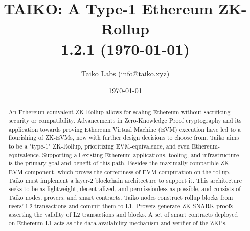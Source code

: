 \documentclass[9pt,oneside]{amsart}
\date{\today}
\title[TAIKO: A Type-1 Ethereum ZK-Rollup\\ \smaller
\textbf{{1.2.1}}]{TAIKO: A Type-1 Ethereum ZK-Rollup \\ \smaller \textbf{{1.2.1 (\today)}}}
\author{Taiko Labs (info@taiko.xyz)}
\begin{document}
\pagecolor{pagecolor}

\begin{abstract}
An Ethereum-equivalent ZK-Rollup allows for scaling Ethereum without sacrificing security or compatibility. Advancements in Zero-Knowledge Proof cryptography and its application towards proving Ethereum Virtual Machine (EVM) execution have led to a flourishing of ZK-EVMs, now with further design decisions to choose from. Taiko aims to be a "type-1" ZK-Rollup, prioritizing EVM-equivalence, and even Ethereum-equivalence. Supporting all existing Ethereum applications, tooling, and infrastructure is the primary goal and benefit of this path. Besides the maximally compatible ZK-EVM component, which proves the correctness of EVM computation on the rollup, Taiko must implement a layer-2 blockchain architecture to support it. This architecture seeks to be as lightweight, decentralized, and permissionless as possible, and consists of Taiko nodes, provers, and smart contracts. Taiko nodes construct rollup blocks from users' L2 transactions and commit them to L1. Provers generate ZK-SNARK proofs asserting the validity of L2 transactions and blocks. A set of smart contracts deployed on Ethereum L1 acts as the data availability mechanism and verifier of the ZKPs.

\end{abstract}

\maketitle
\end{document}
